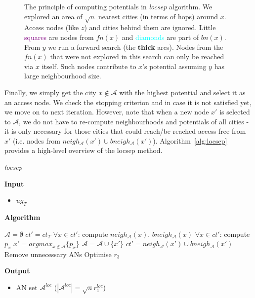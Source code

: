 		\begin{figure}[h!]
			\begin{center}
			\end{center}
			\caption{\label{fig:locsep} The principle of computing potentials in \textit{locsep} algorithm. We explored an area of $\sqrt{n}$ nearest cities (in terms of hops) around $x$. Access nodes (like $z$) and cities behind them are ignored. Little \textcolor{purple}{squares} are nodes from $fn(x)$ and \textcolor{cyan}{diamonds} are part of $bn(x)$. From $y$ we run a forward search (the \textbf{thick} arcs). Nodes from the $fn(x)$ that were not explored in this search can only be reached via $x$ itself. Such nodes contribute to $x$'s potential assuming $y$ has large neighbourhood size.}
		\end{figure}

		\noindent Finally, we simply get the city $x \not \in \mathcal{A}$ with the highest potential and select it as an access node. We check the stopping criterion and in case it is not satisfied yet, we move on to next iteration. However, note that when a new node $x'$ is selected to $\mathcal{A}$, we do not have to re-compute neighbourhoods and potentials of all cities - it is only necessary for those cities that could reach/be reached access-free from $x'$ (i.e. nodes from $neigh_{\mathcal{A}}(x') \cup bneigh_{\mathcal{A}}(x')$). Algorithm~\ref{alg:locsep} provides a high-level overview of the locsep method. \\
		
		\color{algcolor}
		\begin{algorithm}[H]
			\color{inalgcolor}
			\caption{\textit{locsep}}
			\label{alg:locsep}
			\textbf{Input} 
			\begin{itemize}
				\item $ug_{T}$
			\end{itemize}
			\textbf{Algorithm}
			\begin{algorithmic}
				\STATE $\mathcal{A} = \emptyset$
				\STATE $ct' = ct_{T}$
					\STATE $\forall x \in ct'$: compute $neigh_{\mathcal{A}}(x)$, $bneigh_{\mathcal{A}}(x)$
					\STATE $\forall x \in ct'$: compute $p_{x}$
					\STATE $x' = argmax_{x \not \in \mathcal{A}} \{p_{x}\}$
					\STATE $\mathcal{A} = \mathcal{A} \cup \{x'\}$
					\STATE $ct' = neigh_{\mathcal{A}}(x') \cup bneigh_{\mathcal{A}}(x')$
				\ENDWHILE
				\STATE Remove unnecessary ANs
				\STATE Optimise $r_{3}$
			\end{algorithmic}
			\textbf{Output}
			\begin{itemize}
				\item AN set $\mathcal{A}^{loc}$ ($|\mathcal{A}^{loc}| = \sqrt{n} r^{loc}_{1}$)
			\end{itemize}
		\end{algorithm}
		\color{black}
		
